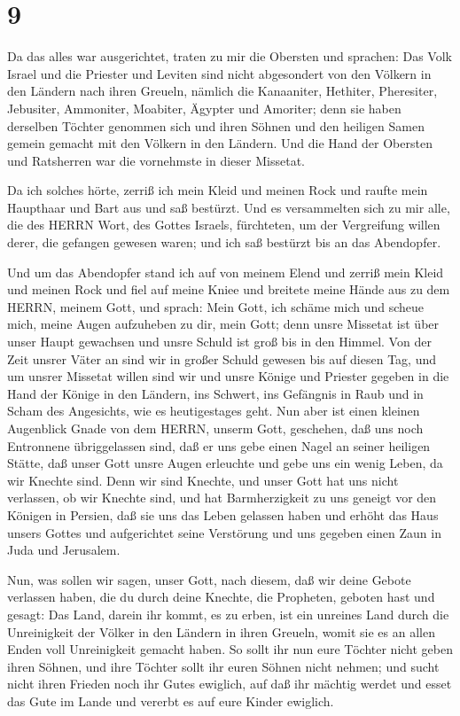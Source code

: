 \hypertarget{section-8}{%
\section{9}\label{section-8}}

 Da das alles war ausgerichtet, traten zu mir die Obersten
und sprachen: Das Volk Israel und die Priester und Leviten sind nicht
abgesondert von den Völkern in den Ländern nach ihren Greueln, nämlich
die Kanaaniter, Hethiter, Pheresiter, Jebusiter, Ammoniter, Moabiter,
Ägypter und Amoriter;  denn sie haben derselben Töchter
genommen sich und ihren Söhnen und den heiligen Samen gemein gemacht mit
den Völkern in den Ländern. Und die Hand der Obersten und Ratsherren war
die vornehmste in dieser Missetat.

 Da ich solches hörte, zerriß ich mein Kleid und meinen Rock
und raufte mein Haupthaar und Bart aus und saß bestürzt. 
Und es versammelten sich zu mir alle, die des HERRN Wort, des Gottes
Israels, fürchteten, um der Vergreifung willen derer, die gefangen
gewesen waren; und ich saß bestürzt bis an das Abendopfer.

 Und um das Abendopfer stand ich auf von meinem Elend und
zerriß mein Kleid und meinen Rock und fiel auf meine Kniee und breitete
meine Hände aus zu dem HERRN, meinem Gott,  und sprach: Mein
Gott, ich schäme mich und scheue mich, meine Augen aufzuheben zu dir,
mein Gott; denn unsre Missetat ist über unser Haupt gewachsen und unsre
Schuld ist groß bis in den Himmel.  Von der Zeit unsrer
Väter an sind wir in großer Schuld gewesen bis auf diesen Tag, und um
unsrer Missetat willen sind wir und unsre Könige und Priester gegeben in
die Hand der Könige in den Ländern, ins Schwert, ins Gefängnis in Raub
und in Scham des Angesichts, wie es heutigestages geht.  Nun
aber ist einen kleinen Augenblick Gnade von dem HERRN, unserm Gott,
geschehen, daß uns noch Entronnene übriggelassen sind, daß er uns gebe
einen Nagel an seiner heiligen Stätte, daß unser Gott unsre Augen
erleuchte und gebe uns ein wenig Leben, da wir Knechte sind.
 Denn wir sind Knechte, und unser Gott hat uns nicht
verlassen, ob wir Knechte sind, und hat Barmherzigkeit zu uns geneigt
vor den Königen in Persien, daß sie uns das Leben gelassen haben und
erhöht das Haus unsers Gottes und aufgerichtet seine Verstörung und uns
gegeben einen Zaun in Juda und Jerusalem.

 Nun, was sollen wir sagen, unser Gott, nach diesem, daß
wir deine Gebote verlassen haben,  die du durch deine
Knechte, die Propheten, geboten hast und gesagt: Das Land, darein ihr
kommt, es zu erben, ist ein unreines Land durch die Unreinigkeit der
Völker in den Ländern in ihren Greueln, womit sie es an allen Enden voll
Unreinigkeit gemacht haben.  So sollt ihr nun eure Töchter
nicht geben ihren Söhnen, und ihre Töchter sollt ihr euren Söhnen nicht
nehmen; und sucht nicht ihren Frieden noch ihr Gutes ewiglich, auf daß
ihr mächtig werdet und esset das Gute im Lande und vererbt es auf eure
Kinder ewiglich.

